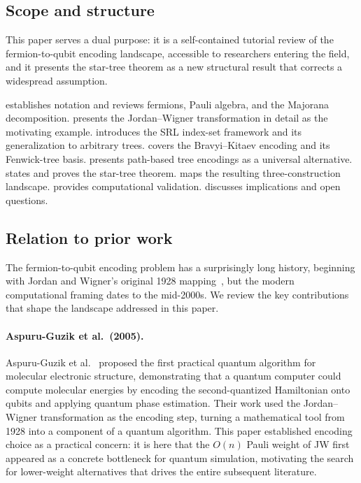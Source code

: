 \subsection{Scope and structure}

This paper serves a dual purpose: it is a self-contained tutorial
review of the fermion-to-qubit encoding landscape, accessible to
researchers entering the field, and it presents the star-tree
theorem as a new structural result that corrects a widespread
assumption.

 establishes notation and reviews fermions, Pauli
algebra, and the Majorana decomposition.   presents
the Jordan--Wigner transformation in detail as the motivating example.
 introduces the SRL index-set framework and
its generalization to arbitrary trees.   covers the
Bravyi--Kitaev encoding and its Fenwick-tree basis.
 presents path-based tree encodings as a
universal alternative.   states and proves the
star-tree theorem.   maps the resulting
three-construction landscape.   provides
computational validation.   discusses
implications and open questions.

\subsection{Relation to prior work}
\label{sec:prior-work}

The fermion-to-qubit encoding problem has a surprisingly long history,
beginning with Jordan and Wigner's original 1928 mapping~\cite{jordan1928},
but the modern computational framing dates to the mid-2000s.  We
review the key contributions that shape the landscape addressed in
this paper.

\paragraph{Aspuru-Guzik et al.\ (2005).}
Aspuru-Guzik et al.~\cite{aspuruguzik2005} proposed the first
practical quantum algorithm for molecular electronic structure,
demonstrating that a quantum computer could compute molecular
energies by encoding the second-quantized Hamiltonian onto qubits
and applying quantum phase estimation.  Their work used the
Jordan--Wigner transformation as the encoding step, turning a
mathematical tool from 1928 into a component of a quantum algorithm.
This paper established encoding choice as a practical concern: it is
here that the $O(n)$ Pauli weight of JW first appeared as a concrete
bottleneck for quantum simulation, motivating the search for
lower-weight alternatives that drives the entire subsequent
literature.

